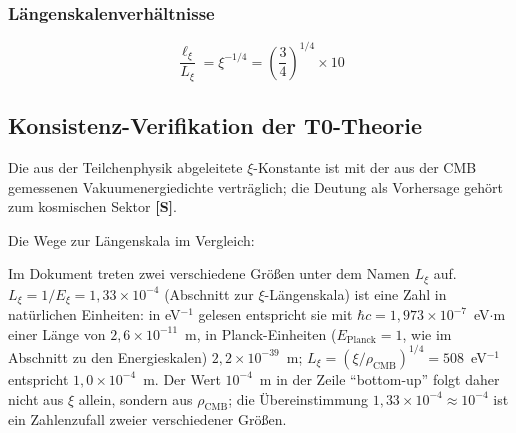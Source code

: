 	\subsubsection{Längenskalenverhältnisse}
	
	\begin{equation}
		\frac{\ell_{\xi}}{L_\xi} = \xi^{-1/4} = \left(\frac{3}{4}\right)^{1/4} \times 10
	\end{equation}
	
	\subsection{Konsistenz-Verifikation der T0-Theorie}
	
	\begin{important}[Konsistenzprüfung]
		Die aus der Teilchenphysik abgeleitete $\xi$-Konstante ist mit der aus der CMB gemessenen Vakuumenergiedichte verträglich; die Deutung als Vorhersage gehört zum kosmischen Sektor \textbf{[S]}.
	\end{important}
	
	Die Wege zur Längenskala im Vergleich:
	
	\begin{table}[htbp]
		\centering
		\caption{Konsistenz-Verifikation der $\xi$-Längenskala}
	\end{table}
	Im Dokument treten zwei verschiedene Größen unter dem Namen $L_\xi$ auf. $L_\xi = 1/E_\xi = 1,33 \times 10^{-4}$ (Abschnitt zur $\xi$-Längenskala) ist eine Zahl in natürlichen Einheiten: in eV$^{-1}$ gelesen entspricht sie mit $\hbar c = 1,973 \times 10^{-7}$~eV$\cdot$m einer Länge von $2,6 \times 10^{-11}$~m, in Planck-Einheiten ($E_{\text{Planck}} = 1$, wie im Abschnitt zu den Energieskalen) $2,2 \times 10^{-39}$~m; $L_\xi = (\xi/\rho_{\text{CMB}})^{1/4} = 508$~eV$^{-1}$ entspricht $1,0 \times 10^{-4}$~m. Der Wert $10^{-4}$~m in der Zeile \enquote{bottom-up} folgt daher nicht aus $\xi$ allein, sondern aus $\rho_{\text{CMB}}$; die Übereinstimmung $1,33 \times 10^{-4} \approx 10^{-4}$ ist ein Zahlenzufall zweier verschiedener Größen.
	
